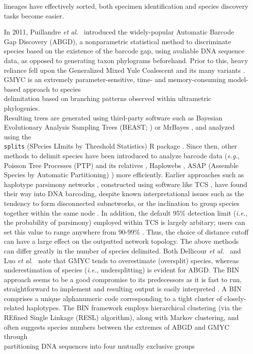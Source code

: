 lineages have effectively sorted, both specimen identification and species discovery tasks become easier. 


  
In 2011, Puillandre \textit{et al.}~\cite{puillandre2011abgd} introduced the widely-popular Automatic Barcode Gap Discovery (ABGD), a nonparametric statistical method to discriminate species based on the existence of the barcode gap, using avaliable DNA sequence data, as opposed to generating taxon phylograms beforehand. Prior to this, heavy reliance fell upon the Generalized Mixed Yule Coalescent and its many variants \cite{fujisawa2013delimiting, monaghan2009accelerated, pons2006sequence, reid2012phylogenetic}. GMYC is an extremely parameter-sensitive, time- and memory-consuming model-based approach to species \\ delimitation based on branching patterns observed within ultrametric phylogenies. \\ Resulting trees are generated using third-party software such as Bayesian Evolutionary Analysis Sampling Trees (BEAST; \cite{drummond2007beast}) or MrBayes \cite{huelsenbeck2001mrbayes}, and analyzed using the \\ {\tt splits} (SPecies LImits by Threshold Statistics) R package \cite{ezard2017splits}. Since then, other methods to delimit species have been introduced to analyze barcode data (\textit{e.g.}, Poisson Tree Processes (PTP) and its relatives \cite{kapli2017multirate, zhang2013general}, Haplowebs \cite{dellicour2015delimiting}, ASAP (Assemble Species by Automatic Partitioning) \cite{puillandre2021asap}) more efficiently. Earlier approaches such as haplotype parsimony networks \cite{templeton1992cladistic}, constructed using software like TCS \cite{clement2000tcs}, have found their way into DNA barcoding, despite known interpretational issues such as the tendency to form disconnected subnetworks, or the inclination to group species together within the same node \cite{hart2007things, phillips2019incomplete}. In addition, the default 95\% detection limit (\textit{i.e.}, the probability of parsimony) employed within TCS is largely arbitary; users can set this value to range anywhere from 90-99\% \cite{clement2000tcs}. Thus, the choice of distance cutoff can have a large effect on the outputted network topology. The above methods can differ greatly in the number of species delimited. Both Dellicour \textit{et al.}~\cite{dellicour2018hitchhiker} and Luo \textit{et al.}~\cite{luo2018comparison} note that GMYC tends to overestimate (oversplit) species, whereas underestimation of species (\textit{i.e.}, undersplitting) is evident for ABGD. The BIN approach \cite{ratnasingham2013dna} seems to be a good compromise to its predecessors as it is fast to run, straightforward to implement and resulting output is easily interpreted \cite{kekkonen2014dna}. A BIN comprises a unique alphanumeric code corresponding to a tight cluster of closely-related haplotypes. The BIN framework employs hierarchical clustering (via the REfined Single Linkage (RESL) algorithm), along with Markov clustering, and often suggests species numbers between the extremes of ABGD and GMYC through \\ partitioning DNA sequences into four mutually exclusive groups 